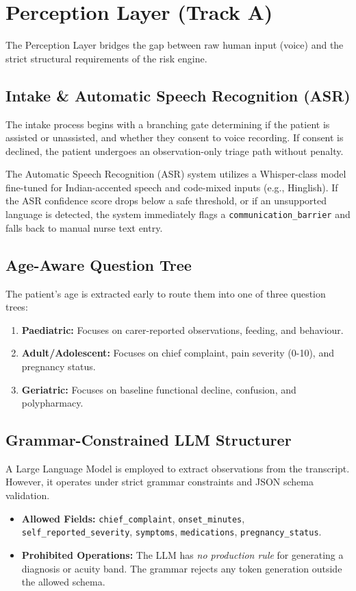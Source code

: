 \section{Perception Layer (Track A)}

The Perception Layer bridges the gap between raw human input (voice) and the strict structural requirements of the risk engine.

\subsection{Intake \& Automatic Speech Recognition (ASR)}
The intake process begins with a branching gate determining if the patient is assisted or unassisted, and whether they consent to voice recording. If consent is declined, the patient undergoes an observation-only triage path without penalty.

The Automatic Speech Recognition (ASR) system utilizes a Whisper-class model fine-tuned for Indian-accented speech and code-mixed inputs (e.g., Hinglish). If the ASR confidence score drops below a safe threshold, or if an unsupported language is detected, the system immediately flags a \texttt{communication\_barrier} and falls back to manual nurse text entry.

\subsection{Age-Aware Question Tree}
The patient’s age is extracted early to route them into one of three question trees:
\begin{enumerate}
    \item \textbf{Paediatric:} Focuses on carer-reported observations, feeding, and behaviour.
    \item \textbf{Adult/Adolescent:} Focuses on chief complaint, pain severity (0-10), and pregnancy status.
    \item \textbf{Geriatric:} Focuses on baseline functional decline, confusion, and polypharmacy.
\end{enumerate}

\subsection{Grammar-Constrained LLM Structurer}
A Large Language Model is employed to extract observations from the transcript. However, it operates under strict grammar constraints and JSON schema validation.
\begin{itemize}
    \item \textbf{Allowed Fields:} \texttt{chief\_complaint}, \texttt{onset\_minutes}, \texttt{self\_reported\_severity}, \texttt{symptoms}, \texttt{medications}, \texttt{pregnancy\_status}.
    \item \textbf{Prohibited Operations:} The LLM has \textit{no production rule} for generating a diagnosis or acuity band. The grammar rejects any token generation outside the allowed schema.
\end{itemize}

